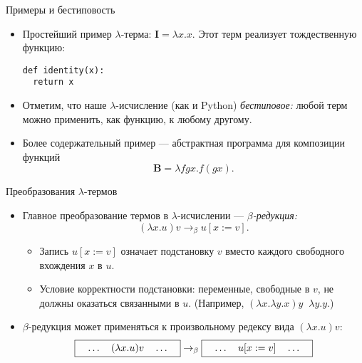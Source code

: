 \documentclass[xcolor=dvipsnames]{beamer}
\newcommand{\Ix}{\mathbf{I}}
\newcommand{\Bx}{\mathbf{B}}
\begin{document}
\begin{frame}[fragile]{Примеры и бестиповость}
 
 \begin{itemize}[<+->]
  \item Простейший пример $\lambda$-терма: $\Ix = \lambda x.x$. Этот терм реализует тождественную функцию:
\begin{verbatim}
def identity(x):
  return x
\end{verbatim}
  \item Отметим, что наше $\lambda$-исчисление (как и Python) {\em бестиповое:} любой терм можно применить, как функцию, к любому другому.
  
  \item Более содержательный пример --- абстрактная программа для композиции функций
  \[
   \Bx = \lambda f g x . f(gx).
  \]

 \end{itemize}

\end{frame}

\begin{frame}{Преобразования $\lambda$-термов}

\begin{itemize}[<+->]
 \item Главное преобразование термов в $\lambda$-исчислении --- {\em $\beta$-редукция:}
 \[
  (\lambda x . u) v \to_\beta
  u[x := v].
 \]
 \vspace*{-1em}
 \begin{itemize}
 \item Запись $u[x:=v]$ означает подстановку $v$ вместо каждого свободного вхождения $x$ в $u$.
 \item Условие корректности подстановки: переменные, свободные в $v$, не должны оказаться связанными в $u$. (Например,
 $(\lambda x. \lambda y. x) y \mathop{\not\to_\beta} \lambda y .y$.)
 \end{itemize}
 \item $\beta$-редукция может применяться к произвольному редексу вида $(\lambda x .u)v$:
 \[
  \mbox{\fbox{$\quad\ldots\quad (\lambda x.u)v \quad \ldots\quad$}} \to_\beta
  \mbox{\fbox{$\quad\ldots\quad u[x:=v] \quad \ldots\quad$}}
 \]

\end{itemize}

 
\end{frame}
\end{document}
